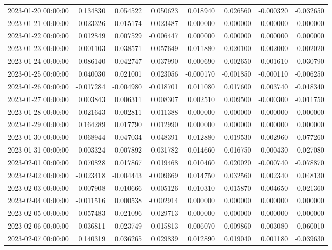 \begin{tabular}{lrrrrrrr}
2023-01-20 00:00:00 & 0.134830 & 0.054522 & 0.050623 & 0.018940 & 0.026560 & -0.000320 & -0.032650 \\
2023-01-21 00:00:00 & -0.023326 & 0.015174 & -0.023487 & 0.000000 & 0.000000 & 0.000000 & 0.000000 \\
2023-01-22 00:00:00 & 0.012849 & 0.007529 & -0.006447 & 0.000000 & 0.000000 & 0.000000 & 0.000000 \\
2023-01-23 00:00:00 & -0.001103 & 0.038571 & 0.057649 & 0.011880 & 0.020100 & 0.002000 & -0.002020 \\
2023-01-24 00:00:00 & -0.086140 & -0.042747 & -0.037990 & -0.000690 & -0.002650 & 0.001610 & -0.030790 \\
2023-01-25 00:00:00 & 0.040030 & 0.021001 & 0.023056 & -0.000170 & -0.001850 & -0.000110 & -0.006250 \\
2023-01-26 00:00:00 & -0.017284 & -0.004980 & -0.018701 & 0.011080 & 0.017600 & 0.003740 & -0.018340 \\
2023-01-27 00:00:00 & 0.003843 & 0.006311 & 0.008307 & 0.002510 & 0.009500 & -0.000300 & -0.011750 \\
2023-01-28 00:00:00 & 0.021643 & 0.002811 & -0.011388 & 0.000000 & 0.000000 & 0.000000 & 0.000000 \\
2023-01-29 00:00:00 & 0.164289 & 0.017790 & 0.012990 & 0.000000 & 0.000000 & 0.000000 & 0.000000 \\
2023-01-30 00:00:00 & -0.068944 & -0.047034 & -0.048391 & -0.012880 & -0.019530 & 0.002960 & 0.077260 \\
2023-01-31 00:00:00 & -0.003324 & 0.007892 & 0.031782 & 0.014660 & 0.016750 & 0.000430 & -0.027080 \\
2023-02-01 00:00:00 & 0.070828 & 0.017867 & 0.019468 & 0.010460 & 0.020020 & -0.000740 & -0.078870 \\
2023-02-02 00:00:00 & -0.023418 & -0.004443 & -0.009669 & 0.014750 & 0.032560 & 0.002340 & 0.048130 \\
2023-02-03 00:00:00 & 0.007908 & 0.010666 & 0.005126 & -0.010310 & -0.015870 & 0.004650 & -0.021360 \\
2023-02-04 00:00:00 & -0.011516 & 0.000538 & -0.002914 & 0.000000 & 0.000000 & 0.000000 & 0.000000 \\
2023-02-05 00:00:00 & -0.057483 & -0.021096 & -0.029713 & 0.000000 & 0.000000 & 0.000000 & 0.000000 \\
2023-02-06 00:00:00 & -0.036811 & -0.023749 & -0.015813 & -0.006070 & -0.009860 & 0.003080 & 0.060010 \\
2023-02-07 00:00:00 & 0.140319 & 0.036265 & 0.029839 & 0.012890 & 0.019040 & 0.001180 & -0.039630 \\

\end{tabular}
